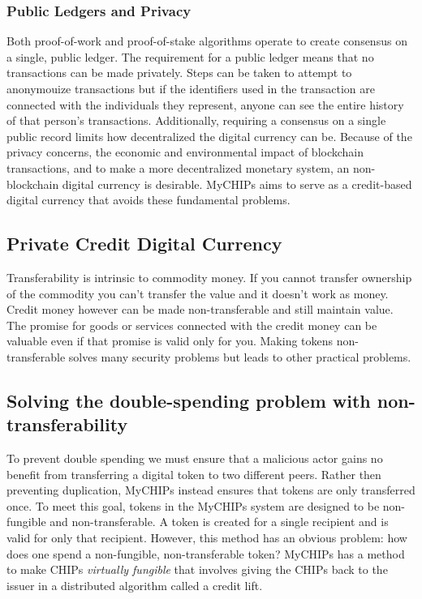 \documentclass[runningheads]{llncs}
\begin{document}
\subsubsection{Public Ledgers and Privacy}
Both proof-of-work and proof-of-stake algorithms operate to create consensus on a single, public ledger. The requirement for a public ledger means that no transactions can be made privately. Steps can be taken to attempt to anonymouize transactions but if the identifiers used in the transaction are connected with the individuals they represent, anyone can see the entire history of that person's transactions. Additionally, requiring a consensus on a single public record limits how decentralized the digital currency can be. Because of the privacy concerns, the economic and environmental impact of blockchain transactions, and to make a more decentralized monetary system, an non-blockchain digital currency is desirable. MyCHIPs aims to serve as a credit-based digital currency that avoids these fundamental problems. 

\subsection{Private Credit Digital Currency}

Transferability is intrinsic to commodity money. If you cannot transfer ownership of the commodity you can't transfer the value and it doesn't work as money. Credit money however can be made non-transferable and still maintain value. The promise for goods or services connected with the credit money can be valuable even if that promise is valid only for you. Making tokens non-transferable solves many security problems but leads to other practical problems.

\subsection{Solving the double-spending problem with non-transferability}
To prevent double spending we must ensure that a malicious actor gains no benefit from transferring a digital token to two different peers. Rather then preventing duplication, MyCHIPs instead ensures that tokens are only transferred once. To meet this goal, tokens in the MyCHIPs system are designed to be non-fungible and non-transferable. A token is created for a single recipient and is valid for only that recipient. However, this method has an obvious problem: how does one spend a non-fungible, non-transferable token? MyCHIPs has a method to make CHIPs \emph{virtually fungible} that involves giving the CHIPs back to the issuer in a distributed algorithm called a credit lift.  \cite{bateman_myCHIPs}
\end{document}
